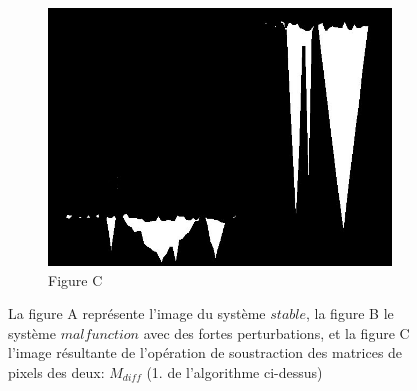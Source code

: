 \documentclass[french]{article}
\theoremstyle{mytheoremstyle}
\theoremstyle{mytheoremstyle}
\theoremstyle{myproblemstyle}
\begin{document}
\begin{figure}[H]
\begin{subfigure}[t]{0.3\textwidth}
            \includegraphics[width=1\linewidth]{images/od_isolated.jpg}
            \caption{Figure C}
    \end{subfigure}
    \caption{La figure A représente l'image du système $stable$, la figure B le système $malfunction$ avec des fortes perturbations, et la figure C l'image résultante de l'opération de soustraction des matrices de pixels des deux: $M_{diff}$ (1. de l'algorithme ci-dessus)}
\end{figure}
\end{document}

